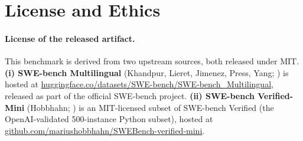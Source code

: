 \documentclass{llmxive}
\begin{document}
%
%
%

\section{ License and Ethics}\label{appendix:license}

\paragraph{License of the released artifact.}
This benchmark is derived from two upstream sources, both released under MIT.
\textbf{(i) SWE-bench Multilingual} (Khandpur, Lieret, Jimenez, Press, Yang;
\cite{swe_smith}) is hosted at
\url{huggingface.co/datasets/SWE-bench/SWE-bench_Multilingual}, released as
part of the official SWE-bench project.
\textbf{(ii) SWE-bench Verified-Mini} (Hobbhahn; \cite{swebench_verified_mini})
is an MIT-licensed subset of SWE-bench Verified (the OpenAI-validated
500-instance Python subset), hosted at
\url{github.com/mariushobbhahn/SWEBench-verified-mini}.
\end{document}
